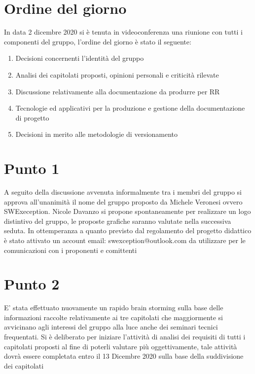 \documentclass[12pt,italian,a4paper]{article}
\begin{document}
	\newpage


	\section*{Ordine del giorno}
	In data 2 dicembre 2020 si è tenuta in videoconferenza una riunione con tutti i componenti del gruppo, l'ordine del giorno è stato il seguente:
	\begin{enumerate}
		\item Decisioni concernenti l'identità del gruppo
		\item Analisi dei capitolati proposti, opinioni personali e criticità rilevate
		\item Discussione relativamente alla documentazione da produrre per RR
		\item Tecnologie ed applicativi per la produzione e gestione della documentazione di progetto
		\item Decisioni in merito alle metodologie di versionamento
	\end{enumerate}

	\section*{Punto 1}
	A seguito della discussione avvenuta informalmente tra i membri del gruppo si approva all’unanimità il nome del gruppo proposto da Michele Veronesi ovvero SWExeception. Nicole Davanzo si propone spontaneamente per realizzare un logo distintivo del gruppo, le proposte grafiche saranno valutate nella successiva seduta.
	In ottemperanza a quanto previsto dal regolamento del progetto didattico è stato attivato un account email: swexception@outlook.com da utilizzare per le comunicazioni con i proponenti e comittenti

	\section*{Punto 2}
    E’ stata effettuato nuovamente un rapido brain storming sulla base delle informazioni raccolte relativamente ai tre capitolati che maggiormente si avvicinano agli interessi del gruppo alla luce anche dei seminari tecnici frequentati.
    Si è deliberato per iniziare l’attività di analisi dei requisiti di tutti i capitolati proposti al fine di poterli valutare più oggettivamente, tale attività dovrà essere completata entro il 13 Dicembre 2020 sulla base della suddivisione dei capitolati
\end{document}
